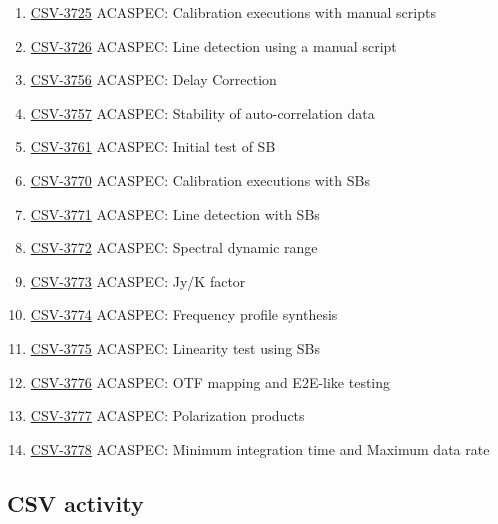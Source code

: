 \begin{enumerate}
\item \href{https://jira.alma.cl/browse/CSV-3724}{CSV-3725} ACASPEC: Calibration executions with manual scripts
\item \href{https://jira.alma.cl/browse/CSV-3725}{CSV-3726} ACASPEC: Line detection using a manual script	
\item \href{https://jira.alma.cl/browse/CSV-3756}{CSV-3756} ACASPEC: Delay Correction	
\item \href{https://jira.alma.cl/browse/CSV-3757}{CSV-3757} ACASPEC: Stability of auto-correlation data	
\item \href{https://jira.alma.cl/browse/CSV-3761}{CSV-3761} ACASPEC: Initial test of SB	
\item \href{https://jira.alma.cl/browse/CSV-3770}{CSV-3770} ACASPEC: Calibration executions with SBs	
\item \href{https://jira.alma.cl/browse/CSV-3771}{CSV-3771} ACASPEC: Line detection with SBs	
\item \href{https://jira.alma.cl/browse/CSV-3772}{CSV-3772} ACASPEC: Spectral dynamic range	
\item \href{https://jira.alma.cl/browse/CSV-3773}{CSV-3773} ACASPEC: Jy/K factor	
\item \href{https://jira.alma.cl/browse/CSV-3774}{CSV-3774} ACASPEC: Frequency profile synthesis	
\item \href{https://jira.alma.cl/browse/CSV-3775}{CSV-3775} ACASPEC: Linearity test using SBs	
\item \href{https://jira.alma.cl/browse/CSV-3776}{CSV-3776} ACASPEC: OTF mapping and E2E-like testing	
\item \href{https://jira.alma.cl/browse/CSV-3777}{CSV-3777} ACASPEC: Polarization products	
\item \href{https://jira.alma.cl/browse/CSV-3778}{CSV-3778} ACASPEC: Minimum integration time and Maximum data rate	
\end{enumerate}


\subsection{CSV activity}

